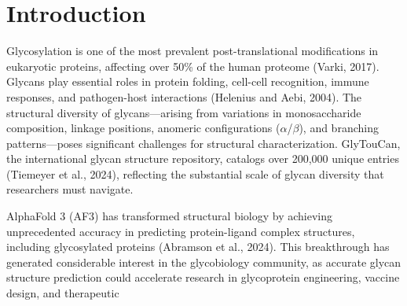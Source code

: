 \documentclass[11pt,a4paper]{article}
\begin{document}
\section{Introduction}

Glycosylation is one of the most prevalent post-translational modifications in eukaryotic proteins, affecting over 50\% of the human proteome (Varki, 2017). Glycans play essential roles in protein folding, cell-cell recognition, immune responses, and pathogen-host interactions (Helenius and Aebi, 2004). The structural diversity of glycans---arising from variations in monosaccharide composition, linkage positions, anomeric configurations ($\alpha$/$\beta$), and branching patterns---poses significant challenges for structural characterization. GlyTouCan, the international glycan structure repository, catalogs over 200,000 unique entries (Tiemeyer et al., 2024), reflecting the substantial scale of glycan diversity that researchers must navigate.

AlphaFold 3 (AF3) has transformed structural biology by achieving unprecedented accuracy in predicting protein-ligand complex structures, including glycosylated proteins (Abramson et al., 2024). This breakthrough has generated considerable interest in the glycobiology community, as accurate glycan structure prediction could accelerate research in glycoprotein engineering, vaccine design, and therapeutic
\end{document}
